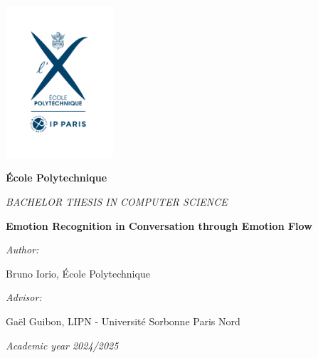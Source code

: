 \documentclass[oneside, a4paper, onecolumn, 11pt]{article}
\newcommand{\thesistitle}[0]{Emotion Recognition in Conversation through Emotion Flow}
\newcommand{\authorname}[0]{Bruno Iorio}
\newcommand{\supervisor}[0]{Gaël Guibon}
\newcommand{\supervisorinstitution}[0]{LIPN - Université Sorbonne Paris Nord}
\begin{document}



\hspace{0pt}
\vfill

\begin{center}

\includegraphics[width=0.3\textwidth]{img/logo-EP-vertical}

\vspace*{2em}
%
{\large
\textbf{\'Ecole Polytechnique}

\vspace*{1em}
\textit{BACHELOR THESIS IN COMPUTER SCIENCE}


\vspace*{3em}
{\Huge \textbf{\thesistitle}}
\vspace*{3em}



\textit{Author:}

\vspace*{1em}
\authorname{}, \'Ecole Polytechnique

\vspace*{2em}
%
{\textit{Advisor:}}

\vspace*{1em}
\supervisor{}, \supervisorinstitution{}
}

\vspace*{2em}
\textit{Academic year 2024/2025}

\end{center}

\vfill
\hspace{0pt}
\end{document}
